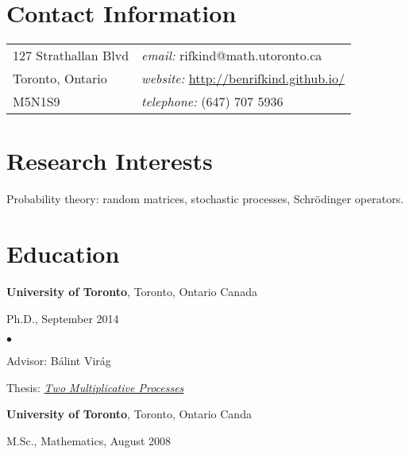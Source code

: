 \documentclass[margin,line]{res}
\newenvironment{list1}{
  \begin{list}{\ding{113}}{%
      \setlength{\itemsep}{0in}
      \setlength{\parsep}{0in} \setlength{\parskip}{0in}
      \setlength{\topsep}{0in} \setlength{\partopsep}{0in} 
      \setlength{\leftmargin}{0.17in}}}{\end{list}}
\newenvironment{list2}{
  \begin{list}{$\bullet$}{%
      \setlength{\itemsep}{0in}
      \setlength{\parsep}{0in} \setlength{\parskip}{0in}
      \setlength{\topsep}{0in} \setlength{\partopsep}{0in} 
      \setlength{\leftmargin}{0.2in}}}{\end{list}}
\begin{document}

\begin{resume}
\section{\sc Contact Information}
\vspace{.05in}
\begin{tabular}{@{}p{2in}p{4in}}
127 Strathallan Blvd  & {\it email:}  rifkind@math.utoronto.ca\\            
Toronto, Ontario   &  {\it website:} \url{http://benrifkind.github.io/} \\
M5N1S9 &    {\it telephone:}  (647) 707 5936   
\end{tabular}

\section{\sc Research Interests}
Probability theory: random matrices, stochastic processes, Schr\"odinger operators.  

\section{\sc Education}
{\bf University of Toronto}, Toronto, Ontario Canada\\
\vspace*{-.1in}
\begin{list1}
\item[] Ph.D., September 2014
\begin{list2}
\vspace*{.05in}
\item Advisor:  B\'{a}lint Vir\'{a}g
\item Thesis: \href{http://individual.utoronto.ca/rifkind/thesis.pdf}{\it Two Multiplicative Processes}
\end{list2}
\vspace*{.05in}
\end{list1}

{\bf University of Toronto}, Toronto, Ontario Canda\\
\vspace*{-.1in}
\begin{list1}
\item[] M.Sc., Mathematics, August 2008
\end{list1}


\end{resume}
\end{document}
